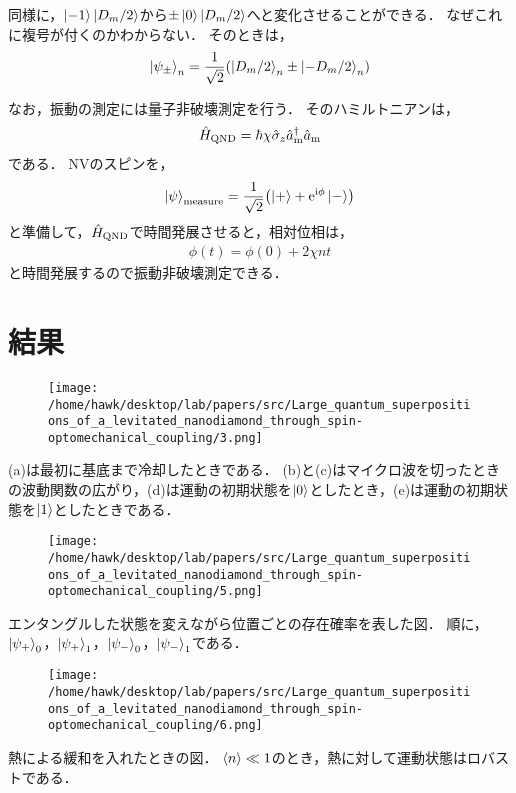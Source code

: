 \documentclass{report}
\begin{document}
    同様に，$\ket{-1}\ket{D_m / 2}$から$\pm\ket{0}\ket{D_m / 2}$へと変化させることができる．
    なぜこれに複号が付くのかわからない．
    そのときは，
    \begin{align}
      \ket{\psi_{\pm}}_n = \frac{1}{\sqrt{2}}\qty(\ket{D_m / 2}_{n} \pm \ket{-D_m / 2}_{n})
    \end{align}
    \par
    なお，振動の測定には量子非破壊測定を行う．
    そのハミルトニアンは，
    \begin{align}
      \hat{H}_{\mathrm{QND}} = \hbar\chi\hat{\sigma}_z\hat{a}^{\dag}_{\mathrm{m}}\hat{a}_{\mathrm{m}}
    \end{align}
    である．
    NVのスピンを，
    \begin{align}
      \ket{\psi}_{\mathrm{measure}} = \frac{1}{\sqrt{2}}\qty(\ket{+} + \mathrm{e}^{\mathrm{i}\phi}\ket{-})
    \end{align}
    と準備して，$\hat{H}_{\mathrm{QND}}$で時間発展させると，相対位相は，
    \begin{align}
      \phi(t) = \phi(0) + 2\chi nt
    \end{align}
    と時間発展するので振動非破壊測定できる．
  \section{結果}
    \begin{figure}[H]
      \centering
      \texttt{[image: /home/hawk/desktop/lab/papers/src/Large\_quantum\_superpositions\_of\_a\_levitated\_nanodiamond\_through\_spin-optomechanical\_coupling/3.png]}
    \end{figure}
    (a)は最初に基底まで冷却したときである．
    (b)と(c)はマイクロ波を切ったときの波動関数の広がり，(d)は運動の初期状態を$\ket{0}$としたとき，(e)は運動の初期状態を$\ket{1}$としたときである．
    \begin{figure}[H]
      \centering
      \texttt{[image: /home/hawk/desktop/lab/papers/src/Large\_quantum\_superpositions\_of\_a\_levitated\_nanodiamond\_through\_spin-optomechanical\_coupling/5.png]}
    \end{figure}
    エンタングルした状態を変えながら位置ごとの存在確率を表した図．
    順に，$\ket{\psi_{+}}_0$，$\ket{\psi_{+}}_1$，$\ket{\psi_{-}}_0$，$\ket{\psi_{-}}_1$である．
    \begin{figure}[H]
      \centering
      \texttt{[image: /home/hawk/desktop/lab/papers/src/Large\_quantum\_superpositions\_of\_a\_levitated\_nanodiamond\_through\_spin-optomechanical\_coupling/6.png]}
    \end{figure}
    熱による緩和を入れたときの図．
    $\ev{n} \ll 1$のとき，熱に対して運動状態はロバストである．
\end{document}
